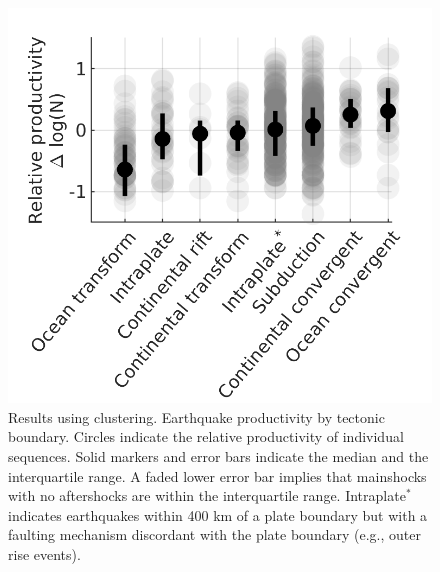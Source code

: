 \documentclass[draft]{agujournal}
\begin{document}
\begin{figure}[H]
    \centering

        \includegraphics{figures/prod_by_pb_z2008.png}
    
    \caption{Results using \citet{Zaliapin2008} clustering. Earthquake productivity by tectonic boundary. Circles indicate the relative productivity of individual sequences. Solid markers and error bars indicate the median and the interquartile range. A faded lower error bar implies that mainshocks with no aftershocks are within the interquartile range. Intraplate$^*$ indicates earthquakes within 400 km of a plate boundary but with a faulting mechanism discordant with the plate boundary (e.g., outer rise events).}
        \label{fig:plate_boundary_z2008}
\end{figure}
\end{document}
